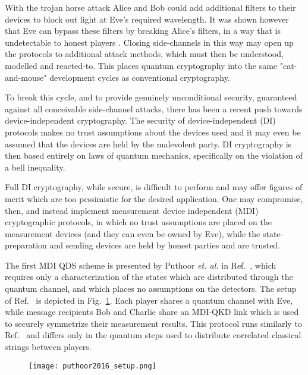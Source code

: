 With the trojan horse attack Alice and Bob could add additional filters to their devices to block out light at Eve's required wavelength. It was shown however that Eve can bypass these filters by breaking Alice's filters, in a way that is undetectable to honest players . Closing side-channels in this way may open up the protocols to additional attack methods, which must then be understood, modelled and reacted-to. This places quantum cryptography into the same "cat-and-mouse" development cycles as conventional cryptography. 

To break this cycle, and to provide genuinely unconditional security, guaranteed against all conceivable side-channel attacks, there has been a recent push towards device-independent cryptography. The security of device-independent (DI) protocols makes no trust assumptions about the devices used and it may even be assumed that the  devices are held by the malevolent party. DI cryptography is then based entirely on laws of quantum mechanics, specifically on the violation of a bell inequality. 

Full DI cryptography, while secure, is difficult to perform and may offer figures of merit which are too pessimistic for the desired application. One may compromise, then, and instead implement measurement device independent (MDI) cryptographic protocols, in which no trust assumptions are placed on the measurement devices (and they can even be owned by Eve), while the state-preparation and sending devices are held by honest parties and are trusted. 

The first MDI QDS scheme is presented by Puthoor \emph{et. al.} in Ref.~\cite{Puthoor2016}, which requires only a characterization of the states which are distributed through the quantum channel, and which places no assumptions on the detectors. The setup of Ref.~\cite{Puthoor2016} is depicted in Fig.~\ref{fig:puthoor2016_setup}. Each player shares a quantum channel with Eve, while message recipients Bob and Charlie share an MDI-QKD link which is used to securely symmetrize their measurement results. This protocol runs similarly to Ref.~\cite{Amiri2016} and differs only in the quantum steps used to distribute correlated classical strings between players. 

\begin{figure}[htp]
\centering
\texttt{[image: puthoor2016\_setup.png]}
\caption{\label{fig:puthoor2016_setup}}
\end{figure}

